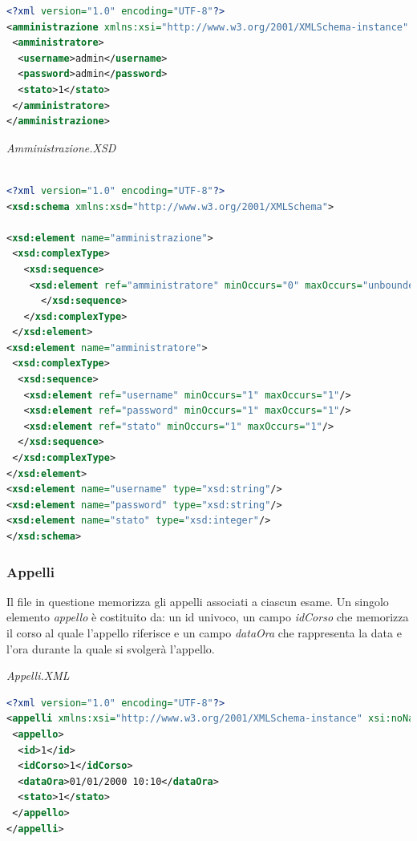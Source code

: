 \documentclass [a4paper,11pt]{book}
\begin{document}
\begin{lstlisting}[language=XML]
<?xml version="1.0" encoding="UTF-8"?>
<amministrazione xmlns:xsi="http://www.w3.org/2001/XMLSchema-instance" xsi:noNamespaceSchemaLocation="amministrazione.xsd">
 <amministratore>
  <username>admin</username>
  <password>admin</password>
  <stato>1</stato>
 </amministratore>
</amministrazione>
\end{lstlisting}

\medskip

\emph{Amministrazione.XSD}

\begin{lstlisting}[language=XML]

<?xml version="1.0" encoding="UTF-8"?>
<xsd:schema xmlns:xsd="http://www.w3.org/2001/XMLSchema">

<xsd:element name="amministrazione">
 <xsd:complexType>
   <xsd:sequence>
    <xsd:element ref="amministratore" minOccurs="0" maxOccurs="unbounded" />
      </xsd:sequence>
   </xsd:complexType>
 </xsd:element>
<xsd:element name="amministratore">
 <xsd:complexType>
  <xsd:sequence>
   <xsd:element ref="username" minOccurs="1" maxOccurs="1"/>
   <xsd:element ref="password" minOccurs="1" maxOccurs="1"/>
   <xsd:element ref="stato" minOccurs="1" maxOccurs="1"/>
  </xsd:sequence>
 </xsd:complexType>
</xsd:element>
<xsd:element name="username" type="xsd:string"/>
<xsd:element name="password" type="xsd:string"/>
<xsd:element name="stato" type="xsd:integer"/>
</xsd:schema>
\end{lstlisting}

\medskip

\subsubsection{Appelli}

Il file in questione memorizza gli appelli associati a ciascun esame. Un singolo elemento \emph{appello} è costituito da: un id univoco, un campo \emph{idCorso} che memorizza il corso al quale l'appello riferisce e un campo \emph{dataOra} che rappresenta la data e l'ora durante la quale si svolgerà l'appello.

\medskip

\emph{Appelli.XML}

\begin{lstlisting}[language=XML]
<?xml version="1.0" encoding="UTF-8"?>
<appelli xmlns:xsi="http://www.w3.org/2001/XMLSchema-instance" xsi:noNamespaceSchemaLocation="appelli.xsd">
 <appello>
  <id>1</id>
  <idCorso>1</idCorso>
  <dataOra>01/01/2000 10:10</dataOra>
  <stato>1</stato>
 </appello>
</appelli>
\end{lstlisting}
\end{document}
